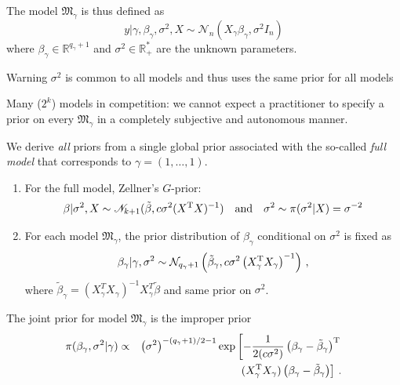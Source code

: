 \begin{slide}
\end{slide}\begin{slide}

The model $\mathfrak{M}_\gamma$ is thus defined as 
$$
y|\gamma,\beta_\gamma,\sigma^2,X\sim\mathscr{N}_n\left(X_{\gamma}\beta_{\gamma},\sigma^2I_n\right)
$$
where $\beta_{\gamma}\in\mathbb{R}^{q_\gamma+1}$ and $\sigma^2\in\mathbb{R}^*_+$ 
are the unknown 
parameters.

\pause\vs
\begin{block}{Warning}
$\sigma^2$ is common to all models and thus uses the same prior for all models
\end{block}

\end{slide}\begin{slide}

Many ($2^k$) models in competition: we cannot expect 
a practitioner to specify a prior on every $\mathfrak{M}_\gamma$ 
in a completely subjective and autonomous manner. 

\vs {} We derive {\em all} priors from a single 
global prior associated with the so-called {\em full model} that corresponds 
to $\gamma=(1,\dots,1)$. 

\end{slide}\begin{slide}

\begin{enumerate}
\renewcommand{\theenumi}{(\roman{enumi})}
\item For the full model, Zellner's $G$-prior:
$$
\beta|\sigma^2,X\sim\mathscr{N}_{k+1}(\tilde\beta,c\sigma^2(X^{\mathrm{T}} X)^{-1})
\quad\text{and}\quad
\sigma^2\sim \pi(\sigma^2|X)=\sigma^{-2}
$$
\item For each model $\mathfrak{M}_\gamma$, the prior distribution of $\beta_{\gamma}$ 
conditional on $\sigma^2$ is fixed as
$$
\beta_\gamma|\gamma,\sigma^2 \sim \mathcal{N}_{q_\gamma+1}\left(\tilde\beta_{\gamma},
	c\sigma^2\left(X_{\gamma}^{\mathrm{T}} X_{\gamma}\right)^{-1}\right)\,,
$$
where $\tilde \beta_\gamma=\left(X_\gamma^TX_\gamma\right)^{-1}X_\gamma^T\tilde\beta$
and same prior on $\sigma^2$. 
\end{enumerate}

\end{slide}\begin{slide}

The joint prior for model $\mathfrak{M}_\gamma$ is
the improper prior
\begin{eqnarray*}
\pi(\beta_\gamma,\sigma^2|\gamma) 
&\propto& \left(\sigma^2\right)^{-(q_\gamma+1)/2-1}
   \exp\left[-\frac{1}{2(c\sigma^2)}\left(\beta_{\gamma}-\tilde\beta_{\gamma}\right)^{\mathrm{T}} \right.\\
&&\quad \left.(X_{\gamma}^{\mathrm{T}} X_{\gamma})\left(\beta_{\gamma}-\tilde\beta_{\gamma}\right)\right]\,.
\end{eqnarray*}


\end{slide}
